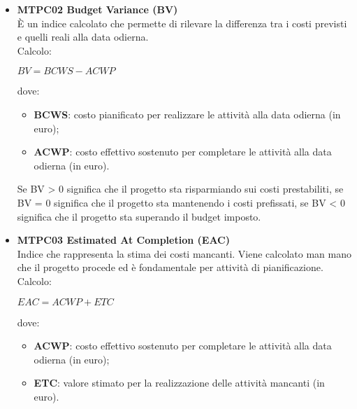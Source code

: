 \begin{itemize}

\item \textbf{MTPC02 Budget Variance (BV)}\-\\
È un indice calcolato che permette di rilevare la differenza tra i costi previsti e quelli reali alla data odierna. \\
Calcolo:
\begin{center}
	$BV = BCWS - ACWP$
\end{center} 
dove:
\begin{itemize}
	\item \textbf{BCWS}: costo pianificato per realizzare le attività alla data odierna (in euro);
	\item \textbf{ACWP}: costo effettivo sostenuto per completare le attività alla data odierna (in euro).
\end{itemize}
Se BV > 0 significa che il progetto sta risparmiando sui costi prestabiliti, se BV = 0 significa che il progetto sta mantenendo i costi prefissati, se BV < 0 significa che il progetto sta superando il budget imposto.

\item \textbf{MTPC03 Estimated At Completion (EAC)}\-\\
Indice che rappresenta la stima dei costi mancanti. Viene calcolato man mano che il progetto procede ed è fondamentale per attività di pianificazione. \\
Calcolo:
\begin{center}
	$EAC = ACWP + ETC$
\end{center}
dove:
\begin{itemize}
	\item \textbf{ACWP}: costo effettivo sostenuto per completare le attività alla data odierna (in euro);
	\item \textbf{ETC}: valore stimato per la realizzazione delle attività mancanti (in euro).
\end{itemize}

\end{itemize}

\iffalse
\subsubsection{MTPC04 Cost Variance(CV)}
Indice che quantifica la produttività o efficienza monitorando se il valore del costo realmente maturato è minore, maggiore o uguale al costo effettivo.
Calcolo:
\begin{center}
	$CV = BCWP - ACWP$
\end{center}
dove:
\begin{itemize}
	\item BCWP: valore delle attività realizzate alla data odierna(in euro o giorni);
	\item ACWP: costo effettivo sostenuto per completare le attività alla data odierna(in euro o giorni).
\end{itemize}
Se CV > 0 significa che il progetto produce con maggior efficienza e minor costo.
\fi

